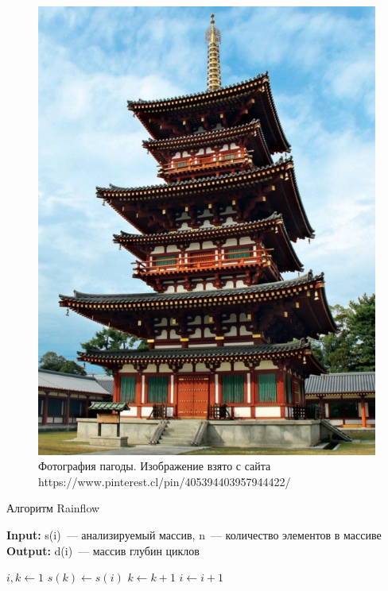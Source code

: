 \begin{enumerate}
\begin{figure}
    \centering
    \includegraphics[scale=0.3]{pics/pagoda.png}
    \caption{Фотография пагоды. Изображение взято с сайта https://www.pinterest.cl/pin/405394403957944422/}
    \label{fig:pagoda}
\end{figure}

\begin{algorithm}
\caption{Алгоритм Rainflow}\label{alg:rainflow}
\hspace*{\algorithmicindent} \textbf{Input:} s(i)~--- анализируемый массив, n~--- количество элементов в массиве \\
\hspace*{\algorithmicindent} \textbf{Output:} d(i)~--- массив глубин циклов 
\begin{algorithmic}[1]

\State $i,k \gets 1$
 
    \State $s(k) \gets s(i)$ 
    \State $k \gets k + 1$
\EndIf
\State $i \gets i + 1$
\EndWhile
{}
\Statex


\end{algorithmic}
\end{algorithm}
\end{enumerate}
